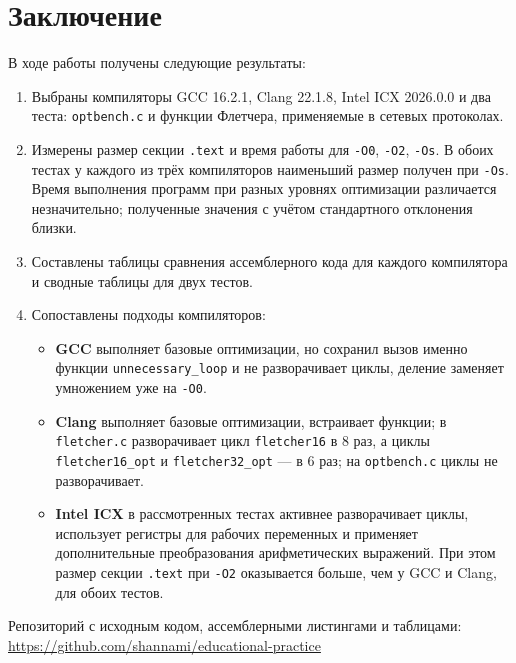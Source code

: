 \documentclass[a4paper]{article}
\begin{document}
\section{Заключение}
В ходе работы получены следующие результаты:
\begin{enumerate}
    \item Выбраны компиляторы GCC 16.2.1, Clang 22.1.8, Intel ICX 2026.0.0 и два теста: \texttt{optbench.c} и функции Флетчера, применяемые в сетевых протоколах.
    \item Измерены размер секции \texttt{.text} и время работы для \texttt{-O0}, \texttt{-O2}, \texttt{-Os}.  В обоих тестах у каждого из трёх компиляторов наименьший размер получен при  \texttt{-Os}. Время выполнения программ при разных уровнях оптимизации различается незначительно; полученные значения с учётом стандартного отклонения близки.
    \item Составлены таблицы сравнения ассемблерного кода для каждого компилятора и сводные таблицы для двух тестов.
    \item Сопоставлены подходы компиляторов:
    \begin{itemize}
        \item \textbf{GCC} выполняет базовые оптимизации, но сохранил вызов именно функции \texttt{unnecessary\_loop} и не разворачивает циклы, деление заменяет умножением уже на \texttt{-O0}.
        \item \textbf{Clang} выполняет базовые оптимизации, встраивает функции; в \texttt{fletcher.c} разворачивает цикл \texttt{fletcher16} в 8 раз, а циклы \texttt{fletcher16\_opt} и \texttt{fletcher32\_opt} — в 6 раз; на \texttt{optbench.c} циклы не разворачивает.
        \item \textbf{Intel ICX} в рассмотренных тестах активнее разворачивает циклы, использует регистры для рабочих переменных и применяет дополнительные преобразования арифметических выражений. При этом размер секции \texttt{.text} при \texttt{-O2} оказывается больше, чем у GCC и Clang, для обоих тестов.
    \end{itemize}
\end{enumerate}

Репозиторий с исходным кодом, ассемблерными листингами и таблицами: \url{https://github.com/shannami/educational-practice}
\end{document}
